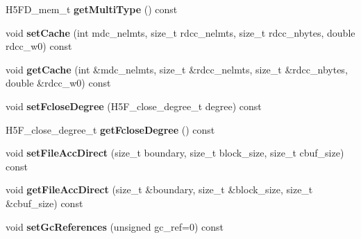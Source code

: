 \begin{DoxyCompactItemize}
\mbox{\label{class_h5_1_1_file_acc_prop_list_aae7718bc0aa467b1a6d9ff24c726baa7}} 
H5\+F\+D\+\_\+mem\+\_\+t {\bfseries get\+Multi\+Type} () const
\item 
\mbox{\label{class_h5_1_1_file_acc_prop_list_a4df2b106678ed74ea6fc98a3e5761a28}} 
void {\bfseries set\+Cache} (int mdc\+\_\+nelmts, size\+\_\+t rdcc\+\_\+nelmts, size\+\_\+t rdcc\+\_\+nbytes, double rdcc\+\_\+w0) const
\item 
\mbox{\label{class_h5_1_1_file_acc_prop_list_a7e2e7ac3b631d82971f2c50788be3861}} 
void {\bfseries get\+Cache} (int \&mdc\+\_\+nelmts, size\+\_\+t \&rdcc\+\_\+nelmts, size\+\_\+t \&rdcc\+\_\+nbytes, double \&rdcc\+\_\+w0) const
\item 
\mbox{\label{class_h5_1_1_file_acc_prop_list_a102a014bec72d14f9eb04b48002f8d6c}} 
void {\bfseries set\+Fclose\+Degree} (H5\+F\+\_\+close\+\_\+degree\+\_\+t degree) const
\item 
\mbox{\label{class_h5_1_1_file_acc_prop_list_a83cbbf1b3f3ae42f6a369a4daddda301}} 
H5\+F\+\_\+close\+\_\+degree\+\_\+t {\bfseries get\+Fclose\+Degree} () const
\item 
\mbox{\label{class_h5_1_1_file_acc_prop_list_a652227ca2eab3fe774621981490a4cc3}} 
void {\bfseries set\+File\+Acc\+Direct} (size\+\_\+t boundary, size\+\_\+t block\+\_\+size, size\+\_\+t cbuf\+\_\+size) const
\item 
\mbox{\label{class_h5_1_1_file_acc_prop_list_afec088f2b00fec4bce5a4ba2ae555632}} 
void {\bfseries get\+File\+Acc\+Direct} (size\+\_\+t \&boundary, size\+\_\+t \&block\+\_\+size, size\+\_\+t \&cbuf\+\_\+size) const
\item 
\mbox{\label{class_h5_1_1_file_acc_prop_list_a9681a7f2855b73ccd63932ce57a74412}} 
void {\bfseries set\+Gc\+References} (unsigned gc\+\_\+ref=0) const
\item 
\mbox{\label{class_h5_1_1_file_acc_prop_list_aaa895a57e480e4fff951a5cea7b6f847}} 

\end{DoxyCompactItemize}
